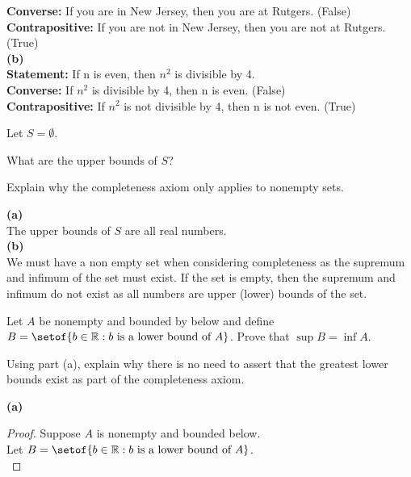 \documentclass[answers,12pt,addpoints]{exam}
\begin{document}
\begin{questions}
\begin{solution}
        \textbf{Converse:} If you are in New Jersey, then you are at Rutgers. (False) \\
        \textbf{Contrapositive:} If you are not in New Jersey, then you are not at Rutgers. (True) \\
        \textbf{(b)}\\
        \textbf{Statement:} If n is even, then $n^2$ is divisible by 4. \\
        \textbf{Converse:} If $n^2$ is divisible by 4, then n is even. (False) \\
        \textbf{Contrapositive:} If $n^2$ is not divisible by 4, then n is not even. (True) \\
    \end{solution}
    \question Let $S= \emptyset$. 
    \begin{parts}
        \item What are the upper bounds of $S$?
        \item Explain why the completeness axiom only applies to nonempty sets.
    \end{parts}
    \begin{solution}
        \textbf{(a)}\\
        The upper bounds of $S$ are all real numbers. \\
        \textbf{(b)}\\
        We must have a non empty set when considering completeness as the supremum and infimum of the set must exist. If the set is empty, then the supremum and infimum do not exist as all numbers are upper (lower) bounds of the set.
    \end{solution}
    \question \begin{parts}
        \item Let $A$ be nonempty and bounded by below and define $B = \setof{b \in \mathbb{R}: b \text{ is a lower bound of } A}$. Prove that $\sup B = \inf A$.
        \item Using part (a), explain why there is no need to assert that the greatest lower bounds exist as part of the completeness axiom.
    \end{parts}
    \begin{solution}
        \textbf{(a)}\\
        \begin{proof}
            Suppose $A$ is nonempty and bounded below. \\
            Let $B = \setof{b \in \mathbb{R}: b \text{ is a lower bound of } A}$. \\

\end{proof}
\end{solution}
\end{questions}
\end{document}

